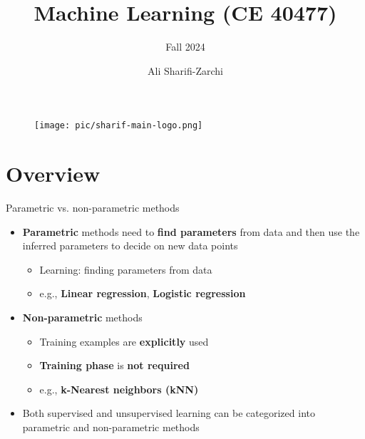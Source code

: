 \documentclass[serif, aspectratio=169]{beamer}
\author{Ali Sharifi-Zarchi}
\title{Machine Learning (CE 40477)}
\subtitle{Fall 2024}
\institute{
    CE Department \\
    Sharif University of Technology
}
\begin{document}
\begin{frame}
    \titlepage
    \vspace*{-0.6cm}
    \begin{figure}[htpb]
        \begin{center}
            \texttt{[image: pic/sharif-main-logo.png]}
        \end{center}
    \end{figure}
\end{frame}

\begin{frame}    
\tableofcontents[sectionstyle=show,
subsectionstyle=show/shaded/hide,
subsubsectionstyle=show/shaded/hide]
\end{frame}

\section{Overview}
\begin{frame}{Parametric vs. non-parametric methods}
    \begin{itemize}
        \item \textbf{Parametric} methods need to \textbf{find parameters} from data and then use the inferred parameters to decide on new data points
        \begin{itemize}
            \item Learning: finding parameters from data
            \item e.g., \textbf{Linear regression}, \textbf{Logistic regression}
        \end{itemize}
        \item \textbf{Non-parametric} methods
        \begin{itemize}
            \item Training examples are \textbf{explicitly} used
            \item \textbf{Training phase} is \textbf{not required}
            \item e.g., \textbf{k-Nearest neighbors (kNN)}
        \end{itemize}
        \item Both supervised and unsupervised learning can be categorized into parametric and non-parametric methods
    \end{itemize}
\end{frame}
\end{document}
